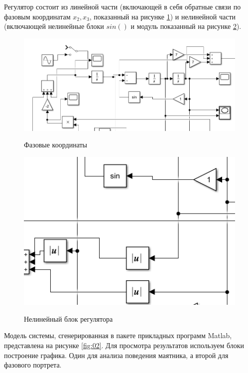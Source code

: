 Регулятор состоит из линейной части (включающей в себя обратные связи по фазовым координатам $x_2,x_3$, показанный на рисунке \ref{fig:11}) и нелинейной части (включающей нелинейные блоки $sin()$ и модуль показанный на рисунке \ref{fig:04}).
\begin{figure}[h!]
\begin{center}
\includegraphics[angle=0,width=17cm]{fig/03.png}\\[2mm]
\caption{Фазовые координаты}\label{fig:11}
\end{center}
\end{figure}
\begin{figure}[h!]
\begin{center}
\includegraphics[angle=0,width=17cm]{fig/04.png}\\[2mm]
\caption{Нелинейный блок регулятора}\label{fig:04}
\end{center}
\end{figure}

Модель системы, сгенерированная в пакете прикладных программ Matlab, представлена на рисунке \ref{fig:02}. Для просмотра результатов используем блоки построение графика. Один для анализа поведения маятника, а второй для фазового портрета.


